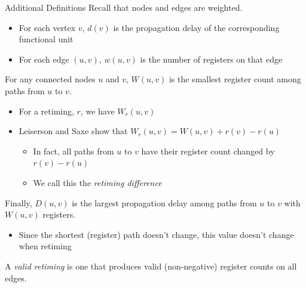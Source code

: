 \begin{frame}{Additional Definitions}
  Recall that nodes and edges are weighted.

  \begin{itemize}
    \item For each vertex $v$, $d(v)$ is the propagation delay of the corresponding functional unit
    \item For each edge $(u, v)$, $w(u, v)$ is the number of registers on that edge
  \end{itemize}

  For any connected nodes $u$ and $v$, $W(u, v)$ is the smallest register count among paths from $u$ to $v$.

  \begin{itemize}
    \item For a retiming, $r$, we have $W_r(u, v)$
    \item Leiserson and Saxe show that $W_r(u, v) = W(u, v) + r(v) - r(u)$
    \begin{itemize}
      \item In fact, all paths from $u$ to $v$ have their register count changed by $r(v) - r(u)$
      \item We call this the \textit{retiming difference}
    \end{itemize}
  \end{itemize}

  Finally, $D(u, v)$ is the largest propagation delay among paths from $u$ to $v$ with $W(u, v)$ registers.

  \begin{itemize}
    \item Since the shortest (register) path doesn't change, this value doesn't change when retiming
  \end{itemize}

  A \textit{valid retiming} is one that produces valid (non-negative) register counts on all edges.

\end{frame}

